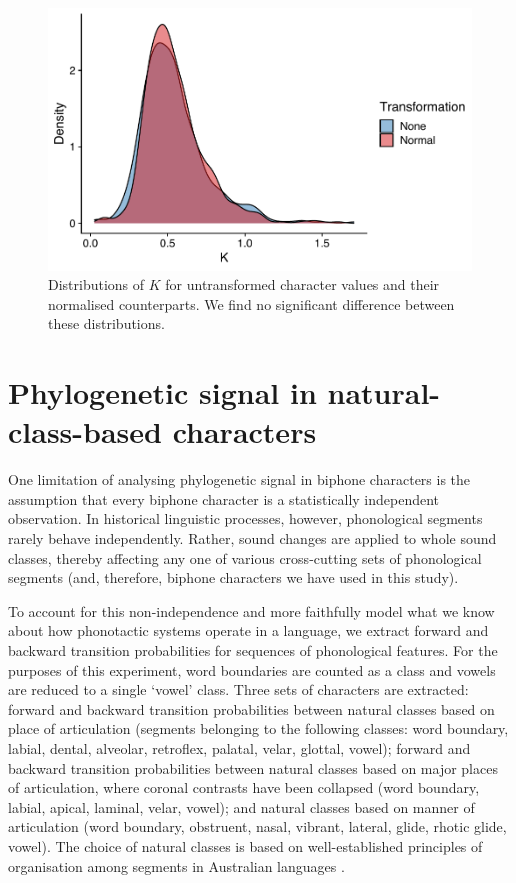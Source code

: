 \begin{figure}[tbp]

{\centering \includegraphics[width=0.66\linewidth]{05-phylo-signal/fig/k-orig-norm} 

}

\caption[Distributions of $K$ for untransformed character values and their normalised counterparts]{Distributions of $K$ for untransformed character values and their normalised counterparts. We find no significant difference between these distributions.}\label{fig:orig-vs-nrmlzd}
\end{figure}

\hypertarget{phy-sig-classes}{%
\section{Phylogenetic signal in natural-class-based characters}\label{phy-sig-classes}}

One limitation of analysing phylogenetic signal in biphone characters is the assumption that every biphone character is a statistically independent observation. In historical linguistic processes, however, phonological segments rarely behave independently. Rather, sound changes are applied to whole sound classes, thereby affecting any one of various cross-cutting sets of phonological segments (and, therefore, biphone characters we have used in this study).

To account for this non-independence and more faithfully model what we know about how phonotactic systems operate in a language, we extract forward and backward transition probabilities for sequences of phonological features. For the purposes of this experiment, word boundaries are counted as a class and vowels are reduced to a single `vowel' class. Three sets of characters are extracted: forward and backward transition probabilities between natural classes based on place of articulation (segments belonging to the following classes: word boundary, labial, dental, alveolar, retroflex, palatal, velar, glottal, vowel); forward and backward transition probabilities between natural classes based on major places of articulation, where coronal contrasts have been collapsed (word boundary, labial, apical, laminal, velar, vowel); and natural classes based on manner of articulation (word boundary, obstruent, nasal, vibrant, lateral, glide, rhotic glide, vowel). The choice of natural classes is based on well-established principles of organisation among segments in Australian languages \autocites{dixon_languages_1980}{hamilton_phonetic_1996}{baker_word_2014}{round_segment_2021}{round_phonotactics_2021}.

